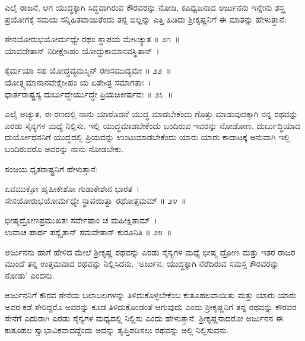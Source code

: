 \begin{artha}
ಎಲೈ ರಾಜನೆ, ಆಗ ಯುದ್ಧಕ್ಕಾಗಿ ಸಿದ್ಧವಾಗಿರುವ ಕೌರವರನ್ನು ನೋಡಿ, ಕಪಿಧ್ವಜನಾದ ಅರ್ಜುನನು ಇನ್ನೇನು ಶಸ್ತ್ರ ಪ್ರಯೋಗಕ್ಕೆ ಸಮಯ ಸನ್ನಿಹಿತವಾಯಿತೆಂದು ತನ್ನ ಬಿಲ್ಲನ್ನು ಎತ್ತಿ ಹಿಡಿದು ಶ‍್ರೀಕೃಷ್ಣ\-ನಿಗೆ ಈ ಮಾತನ್ನು ಹೇಳುತ್ತಾನೆ:
\end{artha}

\begin{shloka}
ಸೇನಯೋರುಭಯೋರ್ಮಧ್ಯೇ ರಥಂ ಸ್ಥಾಪಯ ಮೇsಚ್ಯುತ \hfill॥ ೨೧~॥\\ಯಾವದೇತಾನ್ ನಿರೀಕ್ಷೇsಹಂ ಯೋದ್ಧುಕಾಮಾನವಸ್ಥಿತಾನ್~।
\end{shloka}

\begin{shloka}
ಕೈರ್ಮಯಾ ಸಹ ಯೋದ್ಧವ್ಯಮಸ್ಮಿನ್ ರಣಸಮುದ್ಯಮೇ \hfill॥ ೨೨~॥\\ಯೋತ್ಸ್ಯಮಾನಾನವೇಕ್ಷೇsಹಂ ಯ ಏತೇsತ್ರ ಸಮಾಗತಾಃ~।\\ಧಾರ್ತರಾಷ್ಟ್ರಸ್ಯ ದುರ್ಬುದ್ಧೇರ್ಯುದ್ಧೇ ಪ್ರಿಯಚಿಕೀರ್ಷವಃ \hfill॥ ೨೩~॥
\end{shloka}

\begin{artha}
ಎಲೈ ಅಚ್ಯುತ, ಈ ರಣದಲ್ಲಿ ನಾನು ಯಾರೊಡನೆ ಯುದ್ಧ ಮಾಡಬೇಕೆಂದು ಗೊತ್ತು ಮಾಡುವುದಕ್ಕಾಗಿ ನನ್ನ ರಥವನ್ನು ಎರಡು ಸೈನ್ಯಗಳ ಮಧ್ಯೆ ನಿಲ್ಲಿಸು. ಇಲ್ಲಿ ಯುದ್ಧಮಾಡಬೇಕೆಂದು ಬಂದಿರುವ ಇವರನ್ನು ನೋಡೋಣ. ದುರ್ಬುದ್ಧಿಯಾದ ದುರ್ಯೋಧನನಿಗೆ ಯುದ್ಧದಲ್ಲಿ ಪ್ರಿಯವನ್ನು ಉಂಟುಮಾಡಬೇಕೆಂದು ಯಾರು ಯಾರು ಕಾದಾಟಕ್ಕೆ ಅನುವಾಗಿ ಇಲ್ಲಿ ಬಂದಿರುವರೊ ಅವರನ್ನು ನಾನು ನೋಡಬೇಕು.
\end{artha}

ಸಂಜಯ ಧೃತರಾಷ್ಟ್ರನಿಗೆ ಹೇಳುತ್ತಾನೆ:

\begin{shloka}
ಏವಮುಕ್ತೋ ಹೃಷೀಕೇಶೋ ಗುಡಾಕೇಶೇನ ಭಾರತ~।\\ಸೇನಯೋರುಭಯೋರ್ಮಧ್ಯೇ ಸ್ಥಾಪಯಿತ್ವಾ ರಥೋತ್ತಮಮ್ \hfill॥ ೨೪~॥
\end{shloka}

\begin{shloka}
ಭೀಷ್ಮದ್ರೋಣಪ್ರಮುಖತಃ ಸರ್ವೇಷಾಂ ಚ ಮಹೀಕ್ಷಿತಾಮ್~।\\ಉವಾಚ ಪಾರ್ಥ ಪಶ್ಯೈತಾನ್ ಸಮವೇತಾನ್ ಕುರೂನಿತಿ \hfill॥ ೨೫~॥
\end{shloka}

\begin{artha}
ಅರ್ಜುನನು ಹಾಗೆ ಹೇಳಿದ ಮೇಲೆ ಶ‍್ರೀಕೃಷ್ಣ ರಥವನ್ನು ಎರಡು ಸೈನ್ಯಗಳ ಮಧ್ಯೆ ಭೀಷ್ಮ ದ್ರೋಣ ಮತ್ತು ಇತರ ರಾಜರ ಮುಂದೆ ತನ್ನ ಉತ್ತಮವಾದ ರಥವನ್ನು ನಿಲ್ಲಿಸಿದನು. ‘ಅರ್ಜುನ, ಯುದ್ಧಕ್ಕಾಗಿ ನೆರೆದಿರುವ ಸಮಸ್ತ ಕೌರವರನ್ನು ನೋಡು’ ಎಂದನು.
\end{artha}

ಅರ್ಜುನನಿಗೆ ಕೌರವ ಸೇನೆಯ ಬಲಾಬಲಗಳನ್ನು ತಿಳಿದುಕೊಳ್ಳಬೇಕೆಂಬ ಕುತೂಹಲ\-ವಾಯಿತು ಮತ್ತು ಯಾರು ಯಾರು ಅವರ ಕಡೆ ಸೇರಿದ್ದರೊ ಅವರನ್ನು ಕೂಡ ತಿಳಿದುಕೊಂಡಂತೆ ಆಗುವುದು ಎಂದು ಶ‍್ರೀಕೃಷ್ಣನಿಗೆ ತನ್ನ ರಥವನ್ನು ಕೌರವರ ಸೇನೆಗೆ ಎದುರಾಗಿ ಎರಡು ಸೈನ್ಯಗಳ ಮಧ್ಯದಲ್ಲಿ ನಿಲ್ಲಿಸು ಎಂದು ಹೇಳುತ್ತಾನೆ. ಶ‍್ರೀಕೃಷ್ಣನಾದರೋ ಅರ್ಜುನನ ಈ ಕುತೂಹಲ ಸ್ವಾಭಾವಿಕವಾದದ್ದೆಂದು ಅದನ್ನು ತೃಪ್ತಿಪಡಿಸಲು ರಥವನ್ನು ಅಲ್ಲಿ ನಿಲ್ಲಿಸುವನು.

